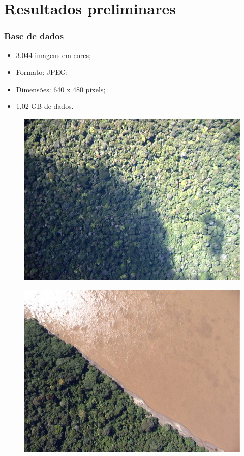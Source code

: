 \documentclass[t]{beamer}
\begin{document}

\section{Resultados preliminares}

\begin{frame}
	\frametitle{Base de dados}

	\begin{itemize}
		\item 3.044 imagens em cores;
		\item Formato: JPEG;
		\item Dimensões: 640 x 480 pixels;
		\item 1,02 GB de dados.
	\end{itemize}

	\begin{multicols}{3}
		\begin{figure}
			\includegraphics[scale=0.3]{imgs/amostra1}
		\end{figure}
		\begin{figure}
			\includegraphics[scale=0.3]{imgs/amostra2}

\end{figure}
\end{multicols}
\end{frame}
\end{document}
